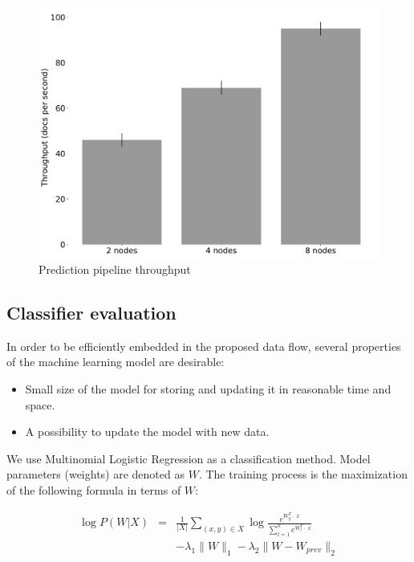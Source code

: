 \begin{figure}[htbp]
  \centering
  \includegraphics[scale=0.21]{pics/classifier_throughput}
  \caption{Prediction pipeline throughput}
  \label {throughput}
\end{figure}

\subsection{Classifier evaluation}

In order to be efficiently embedded in the proposed data flow, several properties of the machine learning model are desirable:
\begin{itemize}
     \item Small size of the model for storing and updating it in reasonable time and space.
     \item A possibility to update the model with new data.
\end{itemize}

We use Multinomial Logistic Regression as a classification method. Model parameters (weights) are denoted as $W$. The training process is the maximization of the following formula in terms of $W$:

$$ 
\begin{array}{rcl}
\log P(W | X)   & = &
 \frac 
      {1}{|X|} \sum \limits_{(x, y) \in X} \log \frac{e^{{W_y^T \cdot \; x}}}
      {\sum \limits_{l = 1}^{k}  e^{{W_{l}^T \cdot \; x}}}                  \\
  & & - \lambda_1 \parallel  W\parallel _1 
   - \lambda_2 \parallel  W - W_{prev} \parallel _2 
   \end {array}
   $$ 


